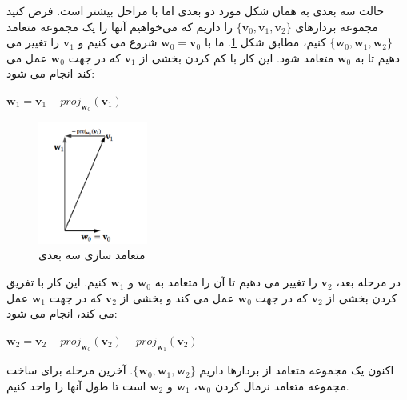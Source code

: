 {\begin{spacing}{1.5}
        حالت سه بعدی به همان شکل مورد دو بعدی اما با مراحل بیشتر است.
        فرض کنید مجموعه بردارهای $\{\textbf{v}_{0},\textbf{v}_{1},\textbf{v}_{2}\}$ را داریم که می‌خواهیم آنها را یک مجموعه متعامد $\{\textbf{w}_{0},\textbf{w}_{1},\textbf{w}_{2}\}$ کنیم، مطابق شکل \ref{fig:4.Session.1.1.12}.
        ما با $\textbf{w}_{0}=\textbf{v}_{0}$ شروع می کنیم و $\textbf{v}_{1}$ را تغییر می دهیم تا به $\textbf{w}_{0}$ متعامد شود.
        این کار با کم کردن بخشی از $\textbf{v}_{1}$ که در جهت $\textbf{w}_{0}$ عمل می کند انجام می شود:

        \begin{center}
            $\textbf{w}_{1}=\textbf{v}_{1}-proj_{\textbf{w}_{0}}(\textbf{v}_{1})$
        \end{center}

        \begin{figure}[H]
            \centering
            \setlength{\belowcaptionskip}{-10pt}
            \includegraphics[width=0.32\textwidth]{Images/4/1/4.Session.1.1.12}
            \caption{متعامد سازی سه بعدی}
            \label{fig:4.Session.1.1.12}
        \end{figure}

        در مرحله بعد، $\textbf{v}_{2}$ را تغییر می دهیم تا آن را متعامد به $\textbf{w}_{0}$ و $\textbf{w}_{1}$ کنیم.
        این کار با تفریق کردن بخشی از $\textbf{v}_{2}$ که در جهت $\textbf{w}_{0}$ عمل می کند و بخشی از $\textbf{v}_{2}$ که در جهت $\textbf{w}_{1}$ عمل می کند، انجام می شود:

        \begin{center}
            $\textbf{w}_{2}=\textbf{v}_{2}-proj_{\textbf{w}_{0}}(\textbf{v}_{2})-proj_{\textbf{w}_{1}}(\textbf{v}_{2})$
        \end{center}

        اکنون یک مجموعه متعامد از بردارها داریم $\{\textbf{w}_{0},\textbf{w}_{1},\textbf{w}_{2}\}$.
        آخرین مرحله برای ساخت مجموعه متعامد نرمال کردن $\textbf{w}_{0}$، $\textbf{w}_{1}$ و $\textbf{w}_{2}$ است تا طول آنها را واحد کنیم.


\end{spacing}}
